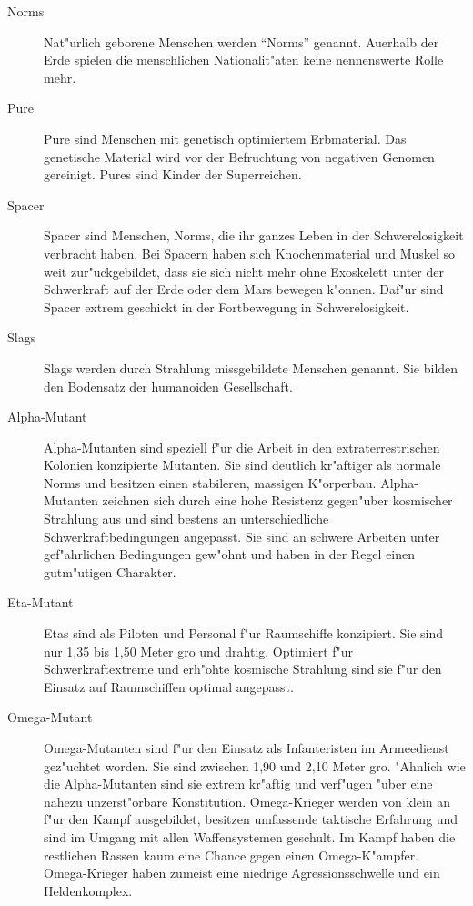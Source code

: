 \begin{description}
\item [Norms] Nat"urlich geborene Menschen werden ``Norms'' genannt. Au\3erhalb der Erde spielen die menschlichen Nationalit"aten 
      keine nennenswerte Rolle mehr.
\item [Pure] Pure sind Menschen mit genetisch optimiertem Erbmaterial. Das genetische Material wird vor der
      Befruchtung von negativen Genomen gereinigt. Pures sind Kinder der Superreichen.
\item [Spacer] Spacer sind Menschen, Norms, die ihr ganzes Leben in der Schwerelosigkeit verbracht haben. Bei Spacern haben
      sich Knochenmaterial und Muskel so weit zur"uckgebildet, dass sie sich nicht mehr ohne Exoskelett unter der Schwerkraft auf der Erde oder dem Mars bewegen k"onnen. Daf"ur sind Spacer extrem geschickt in der Fortbewegung in Schwerelosigkeit.
\item [Slags] Slags werden durch Strahlung missgebildete Menschen genannt. Sie bilden den Bodensatz der humanoiden Gesellschaft.
\item [Alpha-Mutant] Alpha-Mutanten sind speziell f"ur die Arbeit in den extraterrestrischen Kolonien konzipierte Mutanten. Sie sind 
      deutlich kr"aftiger als normale Norms und besitzen einen stabileren, massigen K"orperbau. Alpha-Mutanten zeichnen sich durch eine hohe Resistenz gegen"uber kosmischer Strahlung aus und sind bestens an unterschiedliche Schwerkraftbedingungen angepasst. Sie sind an schwere Arbeiten unter gef"ahrlichen Bedingungen gew"ohnt und haben in der Regel einen gutm"utigen Charakter.
\item [Eta-Mutant] Etas sind als Piloten und Personal f"ur Raumschiffe konzipiert. Sie sind nur 1,35 bis 1,50 Meter gro\3
      und drahtig. Optimiert f"ur Schwerkraftextreme und erh"ohte kosmische Strahlung sind sie f"ur den Einsatz auf Raumschiffen optimal angepasst.
\item [Omega-Mutant] Omega-Mutanten sind f"ur den Einsatz als Infanteristen im Armeedienst gez"uchtet worden. Sie sind zwischen 1,90 und 
      2,10 Meter gro\3. "Ahnlich wie die Alpha-Mutanten sind sie extrem kr"aftig und verf"ugen "uber eine nahezu unzerst"orbare Konstitution. Omega-Krieger werden von klein an f"ur den Kampf ausgebildet, besitzen umfassende taktische Erfahrung und sind im Umgang mit allen Waffensystemen geschult. Im Kampf haben die restlichen Rassen kaum eine Chance gegen einen Omega-K"ampfer. Omega-Krieger haben zumeist eine niedrige Agressionsschwelle und ein Heldenkomplex.
\end{description}

